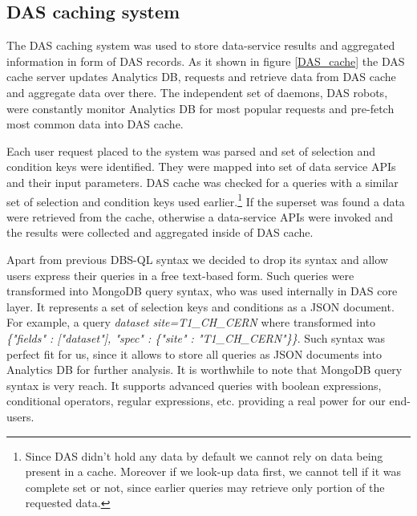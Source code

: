 \documentclass[a4paper]{jpconf}
\begin{document}
\subsection{DAS caching system}
The DAS caching system was used to store data-service results and aggregated
information in form of DAS records. As it shown in figure \ref{DAS_cache} 
the DAS cache server updates Analytics DB, requests and retrieve data from DAS cache
and aggregate data over there. The independent set of daemons, DAS robots, were
constantly monitor Analytics DB for most popular requests and pre-fetch most
common data into DAS cache.

Each user request placed to the system was parsed and set of selection
and condition keys were identified. They were mapped into set of
data service APIs and their input parameters. DAS
cache was checked for a queries with a similar set of selection and condition
keys used earlier.\footnote{Since DAS didn't hold
any data by default we cannot rely on data being present in a cache.
Moreover if we look-up data first, we cannot tell if it was complete
set or not, since earlier queries may retrieve only portion of the requested data.}
If the superset was found a data were
retrieved from the cache, otherwise a data-service APIs were
invoked and the results were collected and aggregated inside of DAS cache.

Apart from previous DBS-QL syntax we decided to drop its syntax and allow users
express their queries in a free text-based form. Such queries were transformed 
into MongoDB query syntax, who was used internally in
DAS core layer. It represents a set of selection keys and conditions as a JSON document.
For example, a query
{\it dataset site=T1\_CH\_CERN}
where transformed into 
{\it \{"fields" : ["dataset"], "spec" : \{"site" : "T1\_CH\_CERN"\}\}}.
Such syntax was perfect fit for us, since it allows to store all queries
as JSON documents into Analytics DB for further analysis. It is worthwhile to note that
MongoDB query syntax is very reach. It supports advanced queries with 
boolean expressions, conditional operators, regular expressions, etc. providing
a real power for our end-users.
\end{document}
